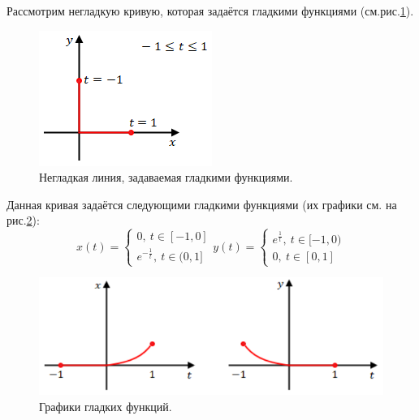 \begin{example}
    Рассмотрим негладкую кривую, которая задаётся гладкими функциями (см.рис.\ref{fig:c12.1}).
    \begin{figure}[htbp]
        \centering
        \includegraphics[scale=0.7]{images/c12.1.png}
        \caption{Негладкая линия, задаваемая гладкими функциями.}
        \label{fig:c12.1}
    \end{figure}

    Данная кривая задаётся следующими гладкими функциями (их графики см. на рис.\ref{fig:c12.2}):
    \[x(t) = \begin{cases}
        0,\ t \in [-1,0] \\
        e^{-\frac{1}{t}},\ t \in (0,1]
    \end{cases}
    y(t) = \begin{cases}
        e^{\frac{1}{t}},\ t \in [-1,0) \\
        0,\ t \in [0,1]
    \end{cases}
    \]

    \begin{figure}[htbp]
        \centering
        \includegraphics[scale=0.5]{images/c12.2.png}
        \caption{Графики гладких функций.}
        \label{fig:c12.2}
    \end{figure}
\end{example}

